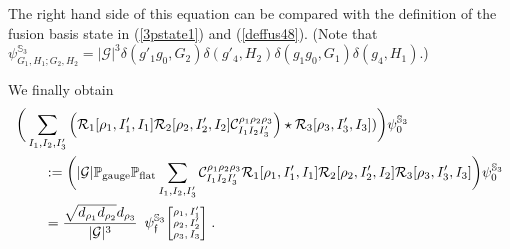 \documentclass[nofootinbib,superscriptaddress,eqsecnum,tightenlines,11pt]{revtex4-1}
\def\nn{\nonumber}
\def\q{\qquad}
\def\mG{\mathcal{G}}
\renewcommand{\S}{{\mathbb S}}
\begin{document}
The right hand side of this equation can be compared with the definition of the fusion basis state in (\ref{3pstate1}) and (\ref{deffus48}). (Note that $\psi^{\S_3}_{G_1,H_1;G_2,H_2} = |\mG|^3  \delta(g'_1 g_0,G_2 ) \delta(g'_4,H_2)\delta(g_1 g_0,G_1  ) \delta(  g_4,  H_1)$.)

We finally obtain
\begin{align}
&\bigg(    \sum_{I_1,I_2,I'_3}  \Big({\cal R}_1[\rho_1,I_1',I_1]{\cal R}_2[\rho_2,I'_2,I_2]  {\cal C}^{\rho_1\rho_2\rho_3}_{I_1I_2I_3'} \Big) \star{\cal R}_3[\rho_3,I_3',I_3]    )  \bigg) \psi^{{\mathbb S}_3}_0
\nn\\
&\q :=\bigg(   |\mG| \mathbb{P}_{\rm gauge} \mathbb{P}_{\rm flat} \sum_{I_1,I_2,I'_3}  {\cal C}^{\rho_1\rho_2\rho_3}_{I_1I_2I_3'}  {\cal R}_1[\rho_1,I_1',I_1]{\cal R}_2[\rho_2,I'_2,I_2]{\cal R}_3[\rho_3,I_3',I_3] \bigg) \psi^{{\mathbb S}_3}_0 \nn\\
&\q =    \frac{ \sqrt{d_{\rho_1}d_{\rho_2}} d_{\rho_3}}  {|\mG|^3} \,\,\,
 \psi^{\S_3}_{\frak f}
	 { \scriptsize\begin{bmatrix} \rho_1,I_1'\\ \rho_2,I_2'\\ \rho_3,I_3\end{bmatrix}}  \; .
\end{align}










\newpage
\end{document}

